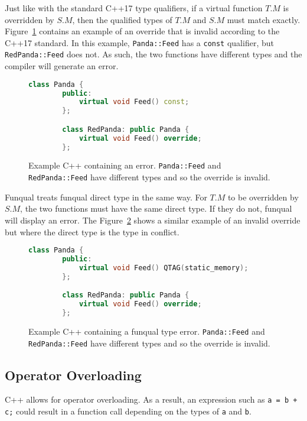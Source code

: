 Just like with the standard C++17 type qualifiers, if a virtual function $T.M$ is overridden by $S.M$, then the qualified types of $T.M$ and $S.M$ must match exactly.  Figure~\ref{lst:rules:bad_override} contains an example of an override that is invalid according to the C++17 standard.  In this example, \lstinline{Panda::Feed} has a \lstinline{const} qualifier, but \lstinline{RedPanda::Feed} does not.  As such, the two functions have different types and the compiler will generate an error.  

\begin{figure}
    \begin{lstlisting}[language=C++,gobble=8]
        class Panda {
        public:
            virtual void Feed() const;
        };

        class RedPanda: public Panda {
            virtual void Feed() override;
        };
    \end{lstlisting}
    \caption{Example C++ containing an error.  \lstinline{Panda::Feed} and \lstinline{RedPanda::Feed} have different types and so the override is invalid.}
    \label{lst:rules:bad_override}
\end{figure}

Funqual treats funqual direct type in the same way.  For $T.M$ to be overridden by $S.M$, the two functions must have the same direct type.  If they do not, funqual will display an error.  The Figure~\ref{lst:rules:bad_override_qtag} shows a similar example of an invalid override but where the direct type is the type in conflict.

\begin{figure}
    \begin{lstlisting}[language=C++,gobble=8]
        class Panda {
        public:
            virtual void Feed() QTAG(static_memory);
        };

        class RedPanda: public Panda {
            virtual void Feed() override;
        };
    \end{lstlisting}
    \caption{Example C++ containing a funqual type error.  \lstinline{Panda::Feed} and \lstinline{RedPanda::Feed} have different types and so the override is invalid.}
    \label{lst:rules:bad_override_qtag}
\end{figure}

\subsection{Operator Overloading}

C++ allows for operator overloading.  As a result, an expression such as \mbox{\lstinline{a = b + c;}} could result in a function call depending on the types of \lstinline{a} and \lstinline{b}.  

